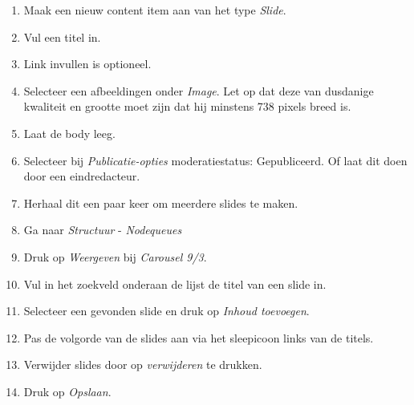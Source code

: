 \begin{enumerate}
\item Maak een nieuw content item aan van het type \emph{Slide}.
\item Vul een titel in.
\item Link invullen is optioneel.
\item Selecteer een afbeeldingen onder \emph{Image}. Let op dat deze van dusdanige kwaliteit en grootte moet zijn dat hij minstens 738 pixels breed is.
\item Laat de body leeg.
\item Selecteer bij \emph{Publicatie-opties} moderatiestatus: Gepubliceerd. Of laat dit doen door een eindredacteur.
\item Herhaal dit een paar keer om meerdere slides te maken.
\item Ga naar \emph{Structuur} - \emph{Nodequeues}
\begin{center}
\end{center}
\item Druk op \emph{Weergeven} bij \emph{Carousel 9/3}.
\item Vul in het zoekveld onderaan de lijst de titel van een slide in.
\item Selecteer een gevonden slide en druk op \emph{Inhoud toevoegen}.
\item Pas de volgorde van de slides aan via het sleepicoon links van de titels.
\item Verwijder slides door op \emph{verwijderen} te drukken.
\item Druk op \emph{Opslaan}.
\end{enumerate}